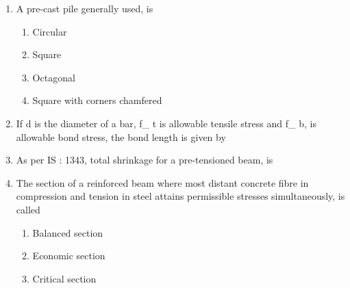 \documentclass[11pt,a4paper]{article}
\begin{document}
\begin{enumerate}
\item{A pre-cast pile generally used, is}
\begin{enumerate}[label=\Alph*.]
\item{Circular}
\item{Square}
\item{Octagonal}
\item{Square with corners chamfered}
\end{enumerate}
\item{If d is the diameter of a bar, f\_ t is allowable tensile stress and f\_ b, is allowable bond stress, the bond length is given by}
\\
\item{As per IS : 1343, total shrinkage for a pre-tensioned beam, is}
\\
\item{The section of a reinforced beam where most distant concrete fibre in compression and tension in steel attains permissible stresses simultaneously, is called}
\begin{enumerate}[label=\Alph*.]
\item{Balanced section}
\item{Economic section}
\item{Critical section}

\end{enumerate}
\end{enumerate}
\end{document}

